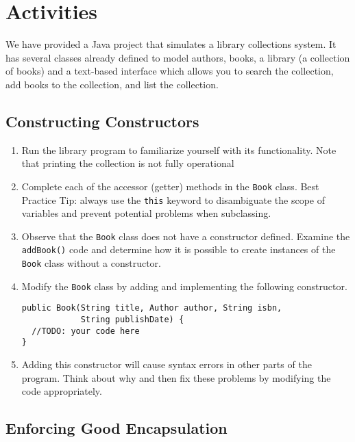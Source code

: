 \documentclass[12pt]{scrartcl}
\begin{document}
\section*{Activities}

We have provided a Java project that simulates a library collections 
system.  It has several classes already defined to model authors, books, 
a library (a collection of books) and a text-based interface which allows 
you to search the collection, add books to the collection, and list the collection.  

\subsection*{Constructing Constructors}

\begin{enumerate}
  \item Run the library program to familiarize yourself with its 
  	functionality.  Note that printing the collection is not fully 
	operational
  \item Complete each of the accessor (getter) methods in the 
	\texttt{Book} class.  Best Practice Tip: always use 
	the \texttt{this} keyword to disambiguate the scope 
	of variables and prevent potential problems when subclassing.
  \item Observe that the \texttt{Book} class does not have 
	a constructor defined.  Examine the \texttt{addBook()} 
	code and determine how it is possible to create instances of the 
	\texttt{Book} class without a constructor.
  \item Modify the \texttt{Book} class by adding and 
	implementing the following constructor.
	
\begin{verbatim}
public Book(String title, Author author, String isbn, 
            String publishDate) {
  //TODO: your code here
}
\end{verbatim}

  \item Adding this constructor will cause syntax errors in other 
  	parts of the program.  Think about why and then fix these problems 
	by modifying the code appropriately.
\end{enumerate}  
  
\subsection*{Enforcing Good Encapsulation}
\end{document}
